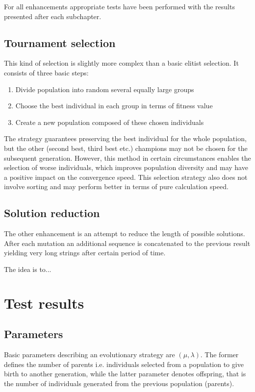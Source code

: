 \documentclass[a4paper]{article}
\begin{document}
For all enhancements appropriate tests have been performed with the results presented after each subchapter.

\subsection{Tournament selection}
This kind of selection is slightly more complex than a basic elitist selection. It consists of three basic steps:
\begin{enumerate}
\item Divide population into random several equally large groups
\item Choose the best individual in each group in terms of fitness value
\item Create a new population composed of these chosen individuals
\end{enumerate}

The strategy guarantees preserving the best individual for the whole population, but the other (second best, third best etc.) champions may not be chosen for the subsequent generation.
However, this method in certain circumstances enables the selection of worse individuals, which improves population diversity and may have a positive impact on the convergence speed.
This selection strategy also does not involve sorting and may perform better in terms of pure calculation speed.

\subsection{Solution reduction}
The other enhancement is an attempt to reduce the length of possible solutions. After each mutation an additional sequence is concatenated to the previous result yielding very long strings after certain period of time.

The idea is to... 

\section{Test results}
\subsection{Parameters}
Basic parameters describing an evolutionary strategy are $(\mu, \lambda)$. The former defines the number of parents i.e. individuals selected from a population to give birth to another generation, while the latter parameter denotes offspring, that is the number of individuals generated from the previous population (parents).
\end{document}
